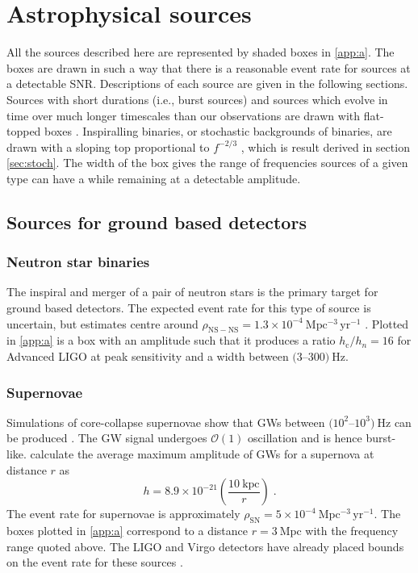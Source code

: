 \section{Astrophysical sources}\label{sec:sources}

All the sources described here are represented by shaded boxes in \ref{app:a}. The boxes are drawn in such a way that there is a reasonable event rate for sources at a detectable SNR. Descriptions of each source are given in the following sections. Sources with short durations (i.e., burst sources) and sources which evolve in time over much longer timescales than our observations are drawn with flat-topped boxes . Inspiralling binaries, or stochastic backgrounds of binaries, are drawn with a sloping top proportional to $f^{-2/3}$ , which is result derived in section \ref{sec:stoch}. The width of the box gives the range of frequencies sources of a given type can have a while remaining at a detectable amplitude.

\subsection{Sources for ground based detectors}

\subsubsection{Neutron star binaries}

The inspiral and merger of a pair of neutron stars is the primary target for ground based detectors. The expected event rate for this type of source is uncertain, but estimates centre around $\rho_{\mathrm{NS-NS}}=1.3\times 10^{-4}~\mathrm{Mpc^{-3}\,yr^{-1}}$ \citep{CBC}. Plotted in \ref{app:a} is a box with an amplitude such that it produces a ratio $h_\mathrm{c}/h_{n}=16$ for Advanced LIGO at peak sensitivity and a width between $(3$--$300)~\mathrm{Hz}$.

\subsubsection{Supernovae}

Simulations of core-collapse supernovae show that GWs between $(10^{2}$--$10^{3})~\mathrm{Hz}$ can be produced \citep{Kotake2006}. The GW signal undergoes ${\mathcal{O}}(1)$ oscillation and is hence burst-like. \citet{2002A&A...393..523D} calculate the average maximum amplitude of GWs for a supernova at distance $r$ as
\begin{equation}
h=8.9\times 10^{-21}\left( \frac{10~\mathrm{kpc}}{r} \right) \; .
\end{equation}
The event rate for supernovae is approximately $\rho_{\mathrm{SN}} = 5\times10^{-4}~\mathrm{Mpc^{-3}\,yr^{-1}}$. The boxes plotted in \ref{app:a} correspond to a distance $r=3~\mathrm{Mpc}$ with the frequency range quoted above. The LIGO and Virgo detectors have already placed bounds on the event rate for these sources \citep{Bursts}.

